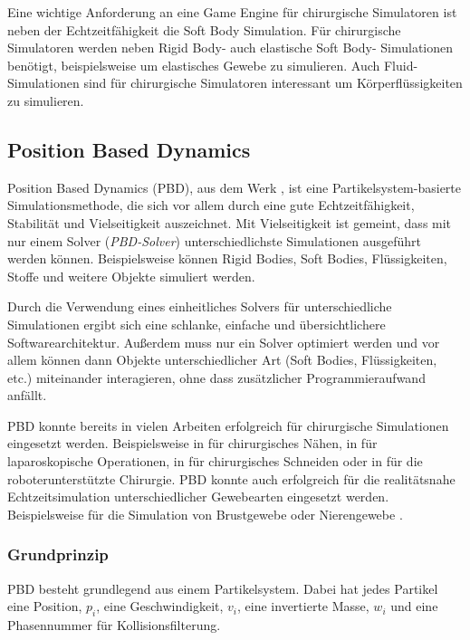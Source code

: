 Eine wichtige Anforderung an eine Game Engine für chirurgische Simulatoren ist neben der Echtzeitfähigkeit die Soft Body Simulation. Für chirurgische Simulatoren werden neben Rigid Body- auch elastische Soft Body- Simulationen benötigt, beispielsweise um elastisches Gewebe zu simulieren. Auch Fluid-Simulationen sind für chirurgische Simulatoren interessant um Körperflüssigkeiten zu simulieren.

\subsection{Position Based Dynamics}
\label{section_PBD}

Position Based Dynamics (PBD), aus dem Werk \cite{PBD}, ist eine Partikelsystem-basierte Simulationsmethode, die sich vor allem durch eine gute Echtzeitfähigkeit, Stabilität und Vielseitigkeit auszeichnet. Mit Vielseitigkeit ist gemeint, dass mit nur einem Solver (\textit{PBD-Solver}) unterschiedlichste Simulationen ausgeführt werden können. Beispielsweise können Rigid Bodies, Soft Bodies, Flüssigkeiten, Stoffe und weitere Objekte simuliert werden. 

Durch die Verwendung eines einheitliches Solvers für unterschiedliche Simulationen ergibt sich eine schlanke, einfache und übersichtlichere Softwarearchitektur. Außerdem muss nur ein Solver optimiert werden und vor allem können dann Objekte unterschiedlicher Art (Soft Bodies, Flüssigkeiten, etc.) miteinander interagieren, ohne dass zusätzlicher Programmieraufwand anfällt.

PBD konnte bereits in vielen Arbeiten erfolgreich für chirurgische Simulationen eingesetzt werden. Beispielsweise in \cite{PBDThread} für chirurgisches Nähen, in \cite{VRLaparoscop} für laparoskopische Operationen, in \cite{PBDCutting} für chirurgisches Schneiden oder in \cite{VRRobSim} für die roboterunterstützte Chirurgie. PBD konnte auch erfolgreich für die realitätsnahe Echtzeitsimulation unterschiedlicher Gewebearten eingesetzt werden. Beispielsweise für die Simulation von Brustgewebe \cite{BreastBiopsy} oder Nierengewebe \cite{PBDKidney}.

\subsubsection{Grundprinzip}

\ac{PBD} besteht grundlegend aus einem Partikelsystem. Dabei hat jedes Partikel eine Position, $p_i$, eine Geschwindigkeit, $v_i$, eine invertierte Masse, $w_i$ und eine Phasennummer für Kollisionsfilterung. 

